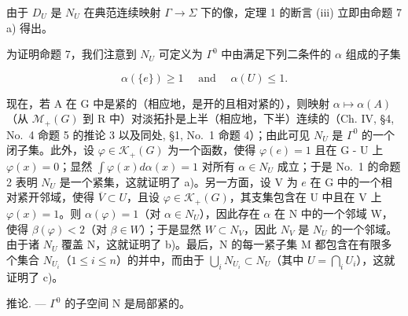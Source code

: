 由于 \(D_{U}\) 是 \(N_{U}\) 在典范连续映射 \(\Gamma \rightarrow \Sigma\) 下的像，定理 1 的断言 (iii) 立即由命题 7 a) 得出。

为证明命题 7，我们注意到 \(N_{U}\) 可定义为 \(\Gamma^{0}\) 中由满足下列二条件的 \(\alpha\) 组成的子集

\[
\alpha (\{e \}) \geqslant 1 \quad \text { and } \quad \alpha (U) \leqslant 1.
\]

现在，若 A 在 G 中是紧的（相应地，是开的且相对紧的），则映射 \(\alpha \mapsto \alpha(A)\)（从 \(\mathcal{M}_{+}(G)\) 到 R 中）对淡拓扑是上半（相应地，下半）连续的（Ch. IV, §4, No.~4 命题 5 的推论 3 以及同处, §1, No.~1 命题 4）；由此可见 \(N_{U}\) 是 \(\Gamma^{0}\) 的一个闭子集。此外，设 \(\varphi \in \mathcal{K}_{+}(G)\) 为一个函数，使得 \(\varphi(e) = 1\) 且在 G - U 上 \(\varphi(x) = 0\)；显然 \(\int \varphi(x)d\alpha(x) = 1\) 对所有 \(\alpha \in N_{U}\) 成立；于是 No.~1 的命题 2 表明 \(N_{U}\) 是一个紧集，这就证明了 a)。另一方面，设 V 为 \(e\) 在 G 中的一个相对紧开邻域，使得 \(\overline{V} \subset U\)，且设 \(\varphi \in \mathcal{K}_{+}(G)\)，其支集包含在 U 中且在 V 上 \(\varphi(x) = 1\)。则 \(\alpha(\varphi) = 1\)（对 \(\alpha \in N_{U}\)），因此存在 \(\alpha\) 在 N 中的一个邻域 W，使得 \(\beta(\varphi) < 2\)（对 \(\beta \in W\)）；于是显然 \(W \subset N_{V}\)，因此 \(N_{V}\) 是 \(N_{U}\) 的一个邻域。由于诸 \(N_{U}\) 覆盖 N，这就证明了 b)。最后，N 的每一紧子集 M 都包含在有限多个集合 \(N_{U_i}\)（\(1 \leqslant i \leqslant n\)）的并中，而由于 \(\bigcup_{i} N_{U_i} \subset N_{U}\)（其中 \(U = \bigcap_{i} U_i\)），这就证明了 c)。

推论. --- \(\Gamma^0\) 的子空间 N 是局部紧的。
